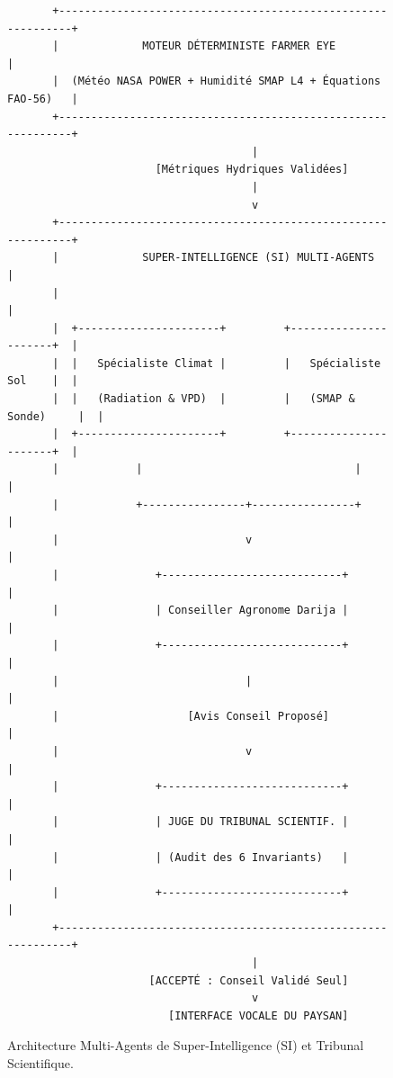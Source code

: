 \documentclass[11pt,a4paper,oneside]{report}
\begin{document}
\begin{figure}[h!]
\centering
\begin{verbatim}
       +-------------------------------------------------------------+
       |             MOTEUR DÉTERMINISTE FARMER EYE                  |
       |  (Météo NASA POWER + Humidité SMAP L4 + Équations FAO-56)   |
       +-------------------------------------------------------------+
                                      |
                       [Métriques Hydriques Validées]
                                      |
                                      v
       +-------------------------------------------------------------+
       |             SUPER-INTELLIGENCE (SI) MULTI-AGENTS            |
       |                                                             |
       |  +----------------------+         +----------------------+  |
       |  |   Spécialiste Climat |         |   Spécialiste Sol    |  |
       |  |   (Radiation & VPD)  |         |   (SMAP & Sonde)     |  |
       |  +----------------------+         +----------------------+  |
       |            |                                 |              |
       |            +----------------+----------------+              |
       |                             v                               |
       |               +----------------------------+                |
       |               | Conseiller Agronome Darija |                |
       |               +----------------------------+                |
       |                             |                               |
       |                    [Avis Conseil Proposé]                   |
       |                             v                               |
       |               +----------------------------+                |
       |               | JUGE DU TRIBUNAL SCIENTIF. |                |
       |               | (Audit des 6 Invariants)   |                |
       |               +----------------------------+                |
       +-------------------------------------------------------------+
                                      |
                      [ACCEPTÉ : Conseil Validé Seul]
                                      v
                         [INTERFACE VOCALE DU PAYSAN]
\end{verbatim}
\caption{Architecture Multi-Agents de Super-Intelligence (SI) et Tribunal Scientifique.}
\label{fig:architecture_si_fr}
\end{figure}
\end{document}
